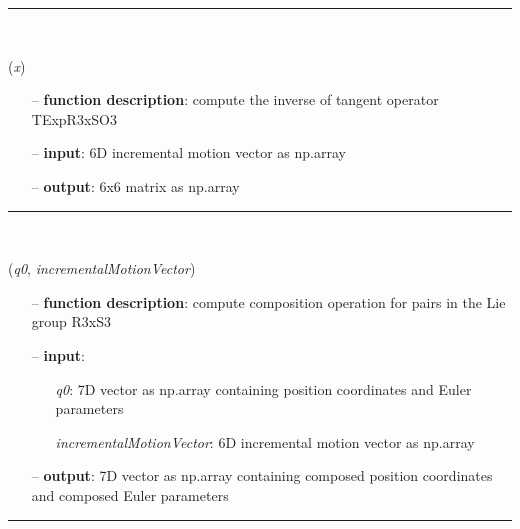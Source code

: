 \begin{itemize}[leftmargin=1.4cm]
\begin{itemize}[leftmargin=0.5cm]
\begin{itemize}[leftmargin=1.4cm]
\begin{itemize}[leftmargin=0.5cm]
\begin{itemize}[leftmargin=1.4cm]
\begin{itemize}[leftmargin=0.5cm]
\begin{itemize}[leftmargin=1.4cm]
\begin{itemize}[leftmargin=1.4cm]
\begin{itemize}[leftmargin=1.4cm]
\begin{itemize}[leftmargin=1.4cm]
\begin{itemize}[leftmargin=0.5cm]
%
\noindent\rule{8cm}{0.75pt}\vspace{1pt} \\ 
\begin{flushleft}
\label{sec:lieGroupBasics:TExpR3xSO3Inv}
({\it x})
\end{flushleft}
\setlength{\itemindent}{0.7cm}
\begin{itemize}[leftmargin=0.7cm]
  \item[--]  {\bf function description}: compute the inverse of tangent operator TExpR3xSO3  \item[--]  {\bf input}: 6D incremental motion vector as np.array  \item[--]  {\bf output}: 6x6 matrix as np.array\vspace{12pt}\end{itemize}
%
\noindent\rule{8cm}{0.75pt}\vspace{1pt} \\ 
\begin{flushleft}
\label{sec:lieGroupBasics:CompositionRuleDirectProductR3AndS3}
({\it q0}, {\it incrementalMotionVector})
\end{flushleft}
\setlength{\itemindent}{0.7cm}
\begin{itemize}[leftmargin=0.7cm]
  \item[--]  {\bf function description}: compute composition operation for pairs in the Lie group R3xS3  \item[--]  {\bf input}: \vspace{-6pt}
  \begin{itemize}[leftmargin=1.2cm]
\setlength{\itemindent}{-0.7cm}
    \item[] {\it q0}: 7D vector as np.array containing position coordinates and Euler parameters
    \item[] {\it   incrementalMotionVector}: 6D incremental motion vector as np.array
  \end{itemize}
  \item[--]  {\bf output}: 7D vector as np.array containing composed position coordinates and composed Euler parameters\vspace{12pt}\end{itemize}
%
\noindent\rule{8cm}{0.75pt}\vspace{1pt} \\ 

\end{itemize}
\end{itemize}
\end{itemize}
\end{itemize}
\end{itemize}
\end{itemize}
\end{itemize}
\end{itemize}
\end{itemize}
\end{itemize}
\end{itemize}

